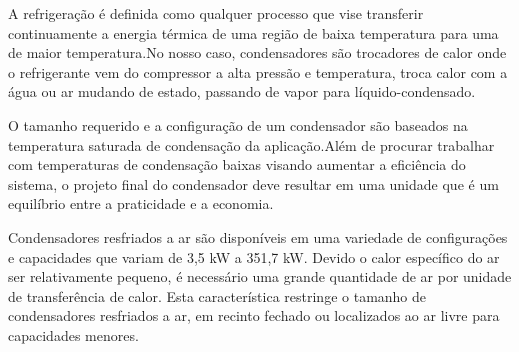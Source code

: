 A refrigeração é definida como qualquer processo que vise transferir continuamente a energia térmica de uma região de baixa temperatura para uma de maior temperatura.No nosso caso, condensadores são  trocadores de calor onde o refrigerante vem do compressor a alta pressão e temperatura, troca calor com a água ou ar mudando de estado, passando de vapor para líquido-condensado. 

O tamanho requerido e a configuração de um condensador são baseados na temperatura saturada de condensação da aplicação.Além de procurar trabalhar com temperaturas de condensação baixas visando aumentar a eficiência do sistema, o projeto final do condensador deve resultar em uma unidade que é um equilíbrio entre a praticidade e a economia.

Condensadores resfriados a ar são disponíveis em uma variedade de configurações e capacidades que variam de 3,5 kW a 351,7 kW. Devido o calor específico do ar ser relativamente pequeno, é necessário uma grande quantidade de ar por unidade de transferência de calor. Esta característica restringe o tamanho de condensadores resfriados a ar, em recinto fechado ou localizados ao ar livre para capacidades menores. 

